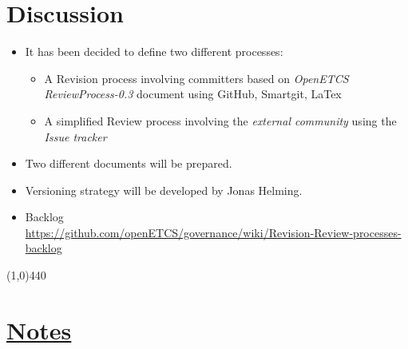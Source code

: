 \documentclass[a4paper, 11pt]{article}
\begin{document}
\section{Discussion}
\begin{itemize}
\item It has been decided to define two different processes: \\
\begin{itemize}
\item A Revision process involving committers based on {\it OpenETCS ReviewProcess-0.3} document using GitHub, Smartgit, LaTex
\item A simplified Review process involving the {\it external community} using the {\it Issue tracker}
\end{itemize} 
\item Two different documents will be prepared. 
\item Versioning strategy will be developed by Jonas Helming.
\item Backlog\\
\url{https://github.com/openETCS/governance/wiki/Revision-Review-processes-backlog}

\end{itemize}

\line(1,0){440}
\section{\underline{Notes}}
\end{document}

